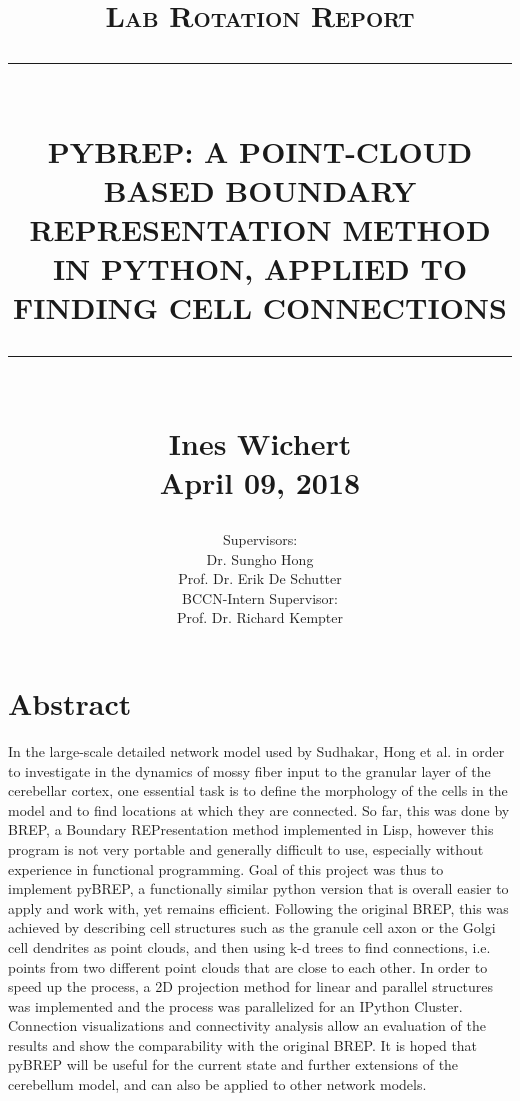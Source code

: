 \documentclass[12pt]{report}
\newcommand{\HRule}[1]{\rule{\linewidth}{#1}}
\begin{document}
\renewcommand\newcounter{section}
\renewcommand\newcounter{subsection}




\title{ \large \textsc{Lab Rotation Report}
		\\ [2.0cm]
		\HRule{0.5pt} \\
		\Large \textbf{\uppercase{pyBREP: A point-cloud based Boundary REPresentation method in python,  applied to finding cell connections}}
		\HRule{2pt} \\ [0.5cm]
		\large Ines Wichert \\ [0.5cm]
		\large April 09, 2018	\\ [0.5 cm]
		\vspace*{5\baselineskip}}


\author{Supervisors: \\ 
	 Dr. Sungho Hong \\
	 Prof. Dr. Erik De Schutter \\
	 BCCN-Intern Supervisor: \\	 
	 Prof. Dr. Richard Kempter\\
		 }
		 
\date{\vspace{-5ex}} %

\maketitle

\section*{Abstract}
In the large-scale detailed network model used by Sudhakar, Hong et al. in order to investigate in the dynamics of mossy fiber input to the granular layer of the cerebellar cortex, one essential task is to define the morphology of the cells in the model and to find locations at which they are connected. So far, this was done by BREP, a Boundary REPresentation method implemented in Lisp, however this program is not very portable and generally difficult to use, especially without experience in functional programming. Goal of this project was thus to implement pyBREP, a functionally similar python version that is overall easier to apply and work with, yet remains efficient. Following the original BREP, this was achieved by describing cell structures such as the granule cell axon or the Golgi cell dendrites as point clouds, and then using k-d trees to find connections, i.e. points from two different point clouds that are close to each other. In order to speed up the process, a 2D projection method for linear and parallel structures was implemented and the process was parallelized for an IPython Cluster. Connection visualizations and connectivity analysis allow an evaluation of the results and show the comparability with the original BREP. It is hoped that pyBREP will be useful for the current state and further extensions of the cerebellum model, and can also be applied to other network models.
\end{document}
